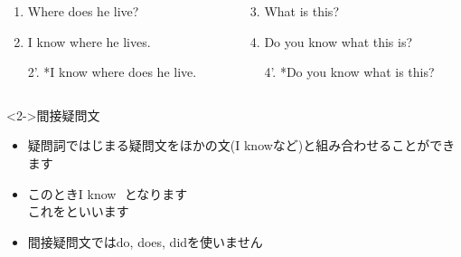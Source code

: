 \documentclass[aspectratio=169,xcolor={dvipsnames,table}]{beamer}
\begin{document}
\begin{frame}[plain]
 
\begin{columns}[t]
 \begin{column}{.45\textwidth}  
\begin{enumerate}
 \item Where does he live?
 \item I know where he lives.
 \item[2'.] *I know where does he live.
\end{enumerate}
 \end{column}
 \begin{column}{.45\textwidth}  
 \begin{enumerate}\setcounter{enumi}{2}
  \item What is this?
   \item Do you know what this is?
  \item[4'.] *Do you know what is this?
 \end{enumerate}
 \end{column}
\end{columns}

\begin{block}<2->{間接疑問文}\small
 \begin{itemize}[square]
  \item 疑問詞ではじまる疑問文をほかの文(I knowなど)と組み合わせることができます\\
  \item このときI know \,\,となります\\
\mbox{}\hfill{\scriptsize {}これをといいます}  \item 間接疑問文ではdo, does, didを使いません
 \end{itemize}

\end{block}
\mbox{}\hfill{\scriptsize {}}

\end{frame}
\end{document}
